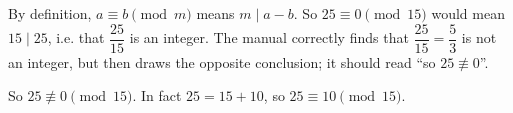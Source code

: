 By definition, $a\equiv b\pmod m$ means $m\mid a-b$. So $25\equiv0\pmod{15}$ would mean $15\mid25$, i.e. that $\dfrac{25}{15}$ is an integer. The manual correctly finds that $\dfrac{25}{15}=\dfrac53$ is not an integer, but then draws the opposite conclusion; it should read ``so $25\not\equiv0$''.

So $\boxed{25\not\equiv0\pmod{15}}$. In fact $25=15+10$, so $25\equiv10\pmod{15}$.
